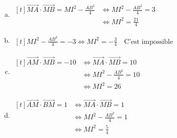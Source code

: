 \documentclass[12pt, a4paper]{article}
\begin{document}
\begin{Exercise}[number={119}]
    \begin{enumerate}[a)]
        \item	$\begin{aligned}[t]
                    \overrightarrow{MA}\cdot\overrightarrow{MB}=MI^2-\frac{AB^2}{4}&\iff MI^2-\frac{AB^2}{4}=3 &\\
                    &\iff MI^2=\frac{21}{4}
                \end{aligned}$
        \item   $\begin{aligned}[t]
                    MI^2-\frac{AB^2}{4}=-3\iff MI^2=-\frac{3}{4} \quad \text{C'est impossible}
                \end{aligned}$
        \item   $\begin{aligned}[t]
                    \overrightarrow{AM}\cdot\overrightarrow{MB}=-10&\iff\overrightarrow{MA}\cdot\overrightarrow{MB}=10 &\\
                    &\iff MI^2-\frac{AB^2}{4}=10 &\\
                    &\iff MI^2=26
                \end{aligned}$
        \item   $\begin{aligned}[t]
                    \overrightarrow{AM}\cdot\overrightarrow{BM}=1&\iff\overrightarrow{MA}\cdot\overrightarrow{MB}=1 &\\
                    &\iff MI^2-\frac{AB^2}{4}=1 &\\
                    &\iff MI^2=\frac{5}{4}
                \end{aligned}$
    \end{enumerate}
\end{Exercise}

\pagebreak
\end{document}
